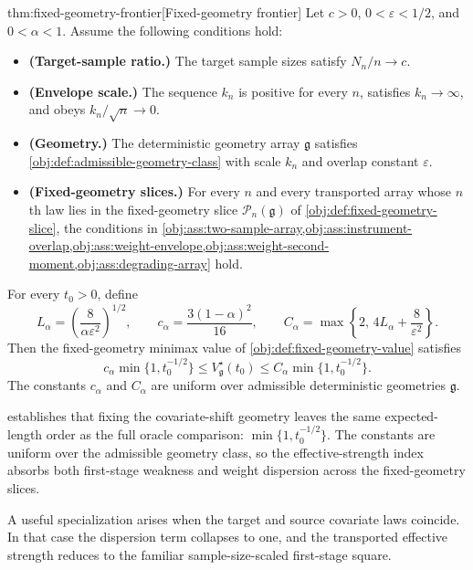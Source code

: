 \begin{theoremv}{thm:fixed-geometry-frontier}[Fixed-geometry frontier]
Let \(c>0\), \(0<\varepsilon<1/2\), and \(0<\alpha<1\). Assume the following conditions hold:
\begin{itemize}
\item \textbf{(Target-sample ratio.)} The target sample sizes satisfy \(N_n/n\to c\).
\item \textbf{(Envelope scale.)} The sequence \(k_n\) is positive for every \(n\), satisfies \(k_n\to\infty\), and obeys \(k_n/\sqrt n\to0\).
\item \textbf{(Geometry.)} The deterministic geometry array \(\mathfrak g\) satisfies \cref{obj:def:admissible-geometry-class} with scale \(k_n\) and overlap constant \(\varepsilon\).
\item \textbf{(Fixed-geometry slices.)} For every \(n\) and every transported array whose \(n\)th law lies in the fixed-geometry slice \(\mathcal P_n(\mathfrak g)\) of \cref{obj:def:fixed-geometry-slice}, the conditions in
\cref{obj:ass:two-sample-array,obj:ass:instrument-overlap,obj:ass:weight-envelope,obj:ass:weight-second-moment,obj:ass:degrading-array}
hold.
\end{itemize}

For every \(t_0>0\), define
\[
L_\alpha=\left(\frac{8}{\alpha\varepsilon^2}\right)^{1/2},
\qquad
c_\alpha=\frac{3(1-\alpha)^2}{16},
\qquad
C_\alpha=\max\left\{2,\,4L_\alpha+\frac{8}{\varepsilon^2}\right\}.
\]
Then the fixed-geometry minimax value of \cref{obj:def:fixed-geometry-value} satisfies
\[
c_\alpha\min\{1,t_0^{-1/2}\}
\le
V_{\mathfrak g}^{\star}(t_0)
\le
C_\alpha\min\{1,t_0^{-1/2}\}.
\]
The constants \(c_\alpha\) and \(C_\alpha\) are uniform over admissible deterministic geometries \(\mathfrak g\).
\end{theoremv}

 establishes that fixing the covariate-shift geometry leaves the same expected-length order as the full oracle comparison: \(\min\{1,t_0^{-1/2}\}\).  The constants are uniform over the admissible geometry class, so the effective-strength index absorbs both first-stage weakness and weight dispersion across the fixed-geometry slices.

A useful specialization arises when the target and source covariate laws coincide.  In that case the dispersion term collapses to one, and the transported effective strength reduces to the familiar sample-size-scaled first-stage square.

